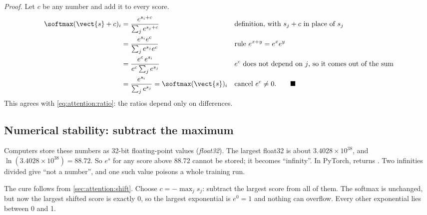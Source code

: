 \emph{Proof.} Let $c$ be any number and add it to every score.
\begin{align*}
  \softmax(\vect{s} + c)_i
  &= \frac{e^{s_i + c}}{\sum_j e^{s_j + c}} && \text{definition, with } s_j + c \text{ in place of } s_j\\
  &= \frac{e^{s_i} e^{c}}{\sum_j e^{s_j} e^{c}} && \text{rule } e^{x+y} = e^{x} e^{y}\\
  &= \frac{e^{c}\, e^{s_i}}{e^{c} \sum_j e^{s_j}} && e^{c} \text{ does not depend on } j \text{, so it comes out of the sum}\\
  &= \frac{e^{s_i}}{\sum_j e^{s_j}} = \softmax(\vect{s})_i && \text{cancel } e^{c} \neq 0. \qquad\blacksquare
\end{align*}
This agrees with \cref{eq:attention:ratio}: the ratios depend only on differences.

\subsection{Numerical stability: subtract the maximum}\label{sec:attention:stable}

Computers store these numbers as 32-bit floating-point values (\emph{float32}). The largest
float32 is about $3.4028\times10^{38}$, and $\ln(3.4028\times10^{38}) = 88.72$. So $e^{s}$ for
any score above 88.72 cannot be stored; it becomes ``infinity''. In PyTorch,
 returns . Two infinities divided give
``not a number'', and one such value poisons a whole training run.

The cure follows from \cref{sec:attention:shift}. Choose $c = -\max_j s_j$: subtract the largest
score from all of them. The softmax is unchanged, but now the largest shifted score is exactly 0,
so the largest exponential is $e^0 = 1$ and nothing can overflow. Every other exponential lies
between 0 and 1. 

